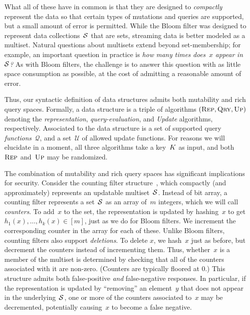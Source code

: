 What all of these have in common is that they are designed to \emph{compactly}
represent the data so that certain types of mutations and queries are supported,
but a small amount of error is permitted.
%
While the Bloom filter was designed to represent data collections~$\mathcal{S}$
that are sets, streaming data is better modeled as a multiset.  Natural
questions about multisets extend beyond set-membership; for example, an
important question in practice is \emph{how many times does~$x$ appear
in~$\mathcal{S}$?} As with Bloom filters, the challenge is to answer this question with
as little space consumption as possible, at the cost of admitting a reasonable
amount of error.

Thus, our syntactic definition of data structures admits both mutability and rich
query spaces.  Formally, a data structure is a triple of algorithms $(\textnormal{\textsc{Rep}},
\textnormal{\textsc{Qry}}, \textnormal{\textsc{Up}})$ denoting the \emph{representation}, \emph{query-evaluation}, and
\emph{Update} algorithms, respectively. Associated to the data structure is a
set of supported query \emph{functions}~$\mathcal{Q}$, and a set~$\mathcal{U}$
of allowed update functions.  For reasons we will elucidate in a moment, all
three algorithms take a key~$K$ as input, and both~$\textnormal{\textsc{Rep}}$ and~$\textnormal{\textsc{Up}}$ may be
randomized.


The combination of mutability and rich query spaces has significant implications
for security. Consider the counting filter structure~\cite{fan2000summary},
which compactly (and approximately) represents an updatable multiset~$\mathcal{S}$.
Instead of bit array, a counting filter represents a set~$\mathcal{S}$ as an array
of~$m$ integers, which we will call \emph{counters}. To add~$x$ to the set, the
representation is updated by hashing~$x$ to get $h_1(x), \ldots, h_k(x)\in[m]$,
just as we do for Bloom filters. We increment the corresponding counter in the
array for each of these. Unlike Bloom filters, counting filters also support
\emph{deletions}. To delete $x$, we hash~$x$ just as before, but decrement the
counters instead of incrementing them.
%
Thus, whether~$x$ is a member of the
multiset is determined by checking that all of the counters associated with
it are non-zero.%
%
(Counters are typically floored at 0.)
%
This structure admits both false-positive \emph{and} false-negative responses.
In particular, if the representation is updated by ``removing'' an element~$y$
that does not appear in the underlying~$\mathcal{S}$, one or more of the counters
associated to~$x$ may be decremented, potentially causing~$x$ to become a false
negative.

